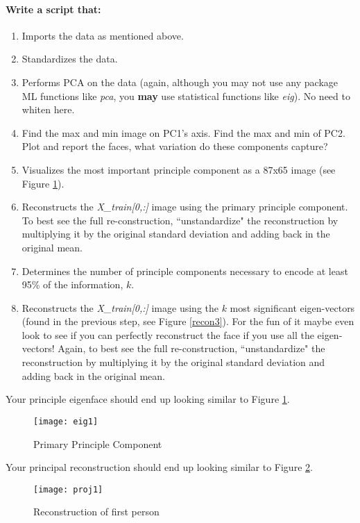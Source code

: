 \documentclass[12pt]{article}
\begin{document}
\paragraph{Write a script that:}
\begin{enumerate}
  \item Imports the data as mentioned above.
  \item Standardizes the data.
  \item Performs PCA on the data (again, although you may not use any package ML functions like \emph{pca}, you \textbf{may} use statistical functions like \emph{eig}).  No need to whiten here.
  \item Find the max and min image on PC1's axis.  Find the max and min of PC2.  Plot and report the faces, what variation do these components capture?
  \item Visualizes the most important principle component as a 87x65 image (see Figure \ref{eigenface1}).
  \item Reconstructs the \emph{X\_train[0,:]} image using the primary principle component. To best see the full re-construction, ``unstandardize" the reconstruction by multiplying it by the original standard deviation and adding back in the original mean.
  \item Determines the number of principle components necessary to encode at least 95\% of the information, $k$.
 \item  Reconstructs the \emph{X\_train[0,:]} image using the $k$ most significant eigen-vectors (found in the previous step, see Figure \ref{recon3}).  For the fun of it maybe even look to see if you can perfectly reconstruct the face if you use all the eigen-vectors!  Again, to best see the full re-construction, ``unstandardize" the reconstruction by multiplying it by the original standard deviation and adding back in the original mean.
\end{enumerate}


\noindent
Your principle eigenface should end up looking similar to Figure \ref{eigenface1}.
\begin{figure}[H]
\begin{center}
\texttt{[image: eig1]}
\caption{Primary Principle Component}
\label{eigenface1}
\end{center}
\end{figure}

Your principal reconstruction should end up looking similar to Figure \ref{recon2}.
\begin{figure}[H]
\begin{center}
\texttt{[image: proj1]}
\caption{Reconstruction of first person}
\label{recon2}
\end{center}
\end{figure}
\end{document}
